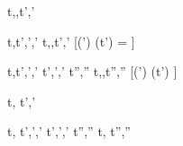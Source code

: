 
  {t,\sigma,\delta \stabilise t',\sigma'}

  {t,\sigma \normalise t',\sigma',\delta'}
  {t,\sigma,\delta \stabilise t',\sigma'}
  [(\delta \cup \delta') \cap \Watching(t') = \nothing]

  {t,\sigma \normalise t',\sigma',\delta' \Quad
   t',\sigma',\delta' \stabilise t'',\sigma''}
  {t,\sigma,\delta \stabilise t'',\sigma''}
  [(\delta \cup \delta') \cap \Watching(t') \neq \nothing]


  {t,\sigma {} t',\sigma'}


  {t,\sigma {} t',\sigma',\delta' \Quad
   t',\sigma',\delta' \stabilise t'',\sigma''}
  {t,\sigma {} t'',\sigma''}
